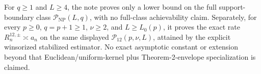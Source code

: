 For \(q\geq1\) and \(L\geq4\), the note proves only a lower bound on the full support-boundary class \(\mathcal P_{\mathrm{NP}}(L,q)\), with no full-class achievability claim.  Separately, for every \(p\geq0\), \(q=p+1\geq1\), \(\nu\geq2\), and \(L\geq L_0(p)\), it proves the exact rate \(R_n^{12,\pm}\asymp a_n\) on the same displayed \(\mathcal P_{12}(p,\nu,L)\), attained by the explicit winsorized stabilized estimator.  No exact asymptotic constant or extension beyond that Euclidean/uniform-kernel plus Theorem-2-envelope specialization is claimed.